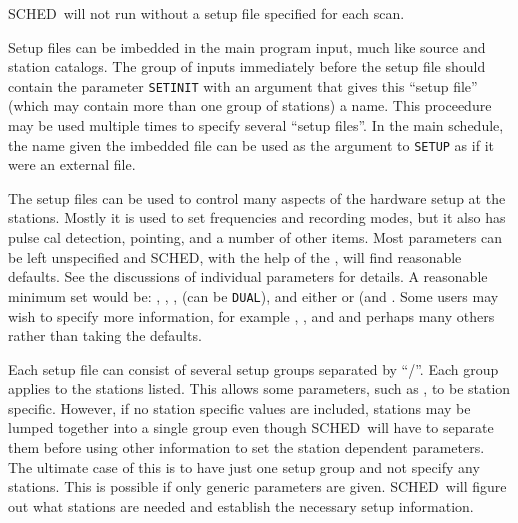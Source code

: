\documentclass{report}
\newcommand{\sched}{{\sc SCHED}}
\newcommand{\schedb}{{\sc SCHED~}}
\begin{document}
\schedb will not run without a setup file specified for each
scan.

Setup files can be imbedded in the main program input, much like
source and station catalogs.  The group of inputs immediately before
the setup file should contain the parameter {\tt SETINIT} with an
argument that gives this ``setup file'' (which may contain more than
one group of stations) a name.  This proceedure may be used multiple
times to specify several ``setup files''.  In the main schedule,
the name given the imbedded file can be used as the argument to
{\tt SETUP} as if it were an external file.

The setup files can be used to control many aspects of the hardware
setup at the stations.  Mostly it is used to set frequencies and
recording modes, but it also has pulse cal detection, pointing, and a
number of other items.  Most parameters can be left unspecified and
\sched, with the help of the ,
will find reasonable defaults.  See the discussions of individual
parameters for details. A reasonable minimum set would be:
, , ,  (can be {\tt DUAL}), and either  or  (and
.  Some users may wish to specify
more information, for example ,
, and  and perhaps many others rather than taking the
defaults.

Each setup file can consist of several setup groups separated by ``/''.
Each group applies to the stations listed.  This allows some parameters,
such as , to be station specific.
However, if no station specific values are included, stations may be
lumped together into a single group even though \schedb will have
to separate them before using other information to set the station
dependent parameters.  The ultimate case of this is to have just
one setup group and not specify any stations.  This is possible if
only generic parameters are given.  \schedb will figure out what
stations are needed and establish the necessary setup information.
\end{document}
